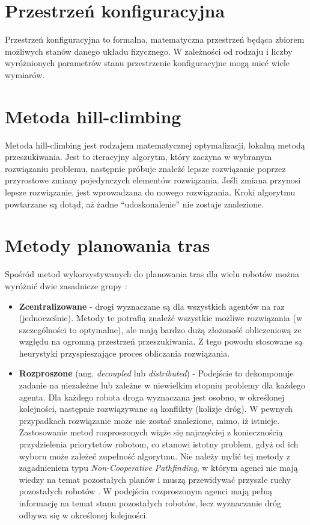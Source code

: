 \section{Przestrzeń konfiguracyjna}
Przestrzeń konfiguracyjna to formalna, matematyczna przestrzeń będąca zbiorem możliwych stanów danego układu fizycznego.
W zależności od rodzaju i liczby wyróżnionych parametrów stanu przestrzenie konfiguracyjne mogą mieć wiele wymiarów.

\section{Metoda hill-climbing}
Metoda hill-climbing jest rodzajem matematycznej optymalizacji, lokalną metodą przeszukiwania.
Jest to iteracyjny algorytm, który zaczyna w wybranym rozwiązaniu problemu, następnie próbuje znaleźć lepsze rozwiązanie poprzez przyrostowe zmiany pojedynczych elementów rozwiązania.
Jeśli zmiana przynosi lepsze rozwiązanie, jest wprowadzana do nowego rozwiązania.
Kroki algorytmu powtarzane są dotąd, aż żadne ``udoskonalenie'' nie zostaje znalezione.

\section{Metody planowania tras}
Spośród metod wykorzystywanych do planowania tras dla wielu robotów można wyróżnić dwie zasadnicze grupy \cite{latombe}:
\begin{itemize}
	\item {\bf Zcentralizowane} - drogi wyznaczane są dla wszystkich agentów na raz (jednocześnie). Metody te potrafią znaleźć wszystkie możliwe rozwiązania (w szczególności to optymalne), ale mają bardzo dużą złożoność obliczeniową ze względu na ogromną przestrzeń przeszukiwania. Z tego powodu stosowane są heurystyki przyspieszające proces obliczania rozwiązania.
	\item {\bf Rozproszone} (ang. {\it decoupled} lub {\it distributed}) - Podejście to dekomponuje zadanie na niezależne lub zależne w niewielkim stopniu problemy dla każdego agenta. Dla każdego robota droga wyznaczana jest osobno, w określonej kolejności, następnie rozwiązywane są konflikty (kolizje dróg). W pewnych przypadkach rozwiązanie może nie zostać znalezione, mimo, iż istnieje. Zastosowanie metod rozproszonych wiąże się najczęściej z koniecznością przydzielenia priorytetów robotom, co stanowi istotny problem, gdyż od ich wyboru może zależeć zupełność algorytmu. Nie należy mylić tej metody z zagadnieniem typu {\it Non-Cooperative Pathfinding}, w którym agenci nie mają wiedzy na temat pozostałych planów i muszą przewidywać przyszłe ruchy pozostałych robotów \cite{cooppath}. W podejściu rozproszonym agenci mają pełną informację na temat stanu pozostałych robotów, lecz wyznaczanie dróg odbywa się w określonej kolejności.
\end{itemize}

